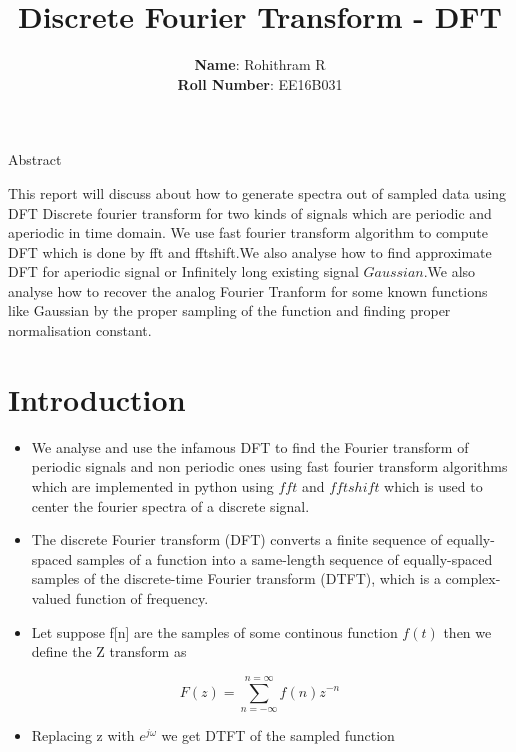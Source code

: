 \documentclass[11pt]{article}
\title{Discrete Fourier Transform - DFT}
\author{
  \textbf{Name}: Rohithram R\\
  \textbf{Roll Number}: EE16B031
}
\providecommand{\tightlist}{%
      \setlength{\itemsep}{0pt}\setlength{\parskip}{0pt}}
\begin{document}
    
    
    \maketitle
    
    

    
	
		
    Abstract

 This report will discuss about how to generate spectra out of sampled
data using DFT Discrete fourier transform for two kinds of signals which
are periodic and aperiodic in time domain. We use fast fourier transform
algorithm to compute DFT which is done by fft and fftshift.We also
analyse how to find approximate DFT for aperiodic signal or Infinitely
long existing signal \(Gaussian\).We also analyse how to recover the
analog Fourier Tranform for some known functions like Gaussian by the
proper sampling of the function and finding proper normalisation
constant.

	

	
		
    \section{Introduction}\label{introduction}

\begin{itemize}
\tightlist
\item
  We analyse and use the infamous DFT to find the Fourier transform of
  periodic signals and non periodic ones using fast fourier transform
  algorithms which are implemented in python using \(fft\) and
  \(fftshift\) which is used to center the fourier spectra of a discrete
  signal.
\item
  The discrete Fourier transform (DFT) converts a finite sequence of
  equally-spaced samples of a function into a same-length sequence of
  equally-spaced samples of the discrete-time Fourier transform (DTFT),
  which is a complex-valued function of frequency.
\item
  Let suppose f{[}n{]} are the samples of some continous function
  \(f(t)\) then we define the Z transform as
\end{itemize}

\begin{equation}
F(z) = \sum_{n = -\infty}^{n = \infty} f(n)z^{-n}
\end{equation}

\begin{itemize}
\tightlist
\item
  Replacing z with \(e^{j\omega}\) we get DTFT of the sampled function
\end{itemize}
\end{document}
